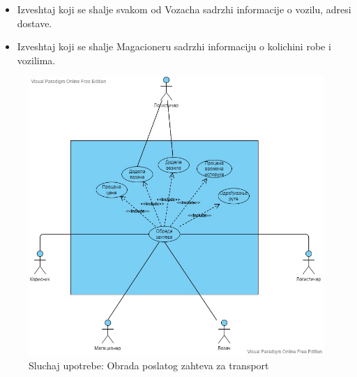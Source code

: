 \begin{enumerate}
\begin{itemize}
                \item Izveshtaj koji se shalje svakom od Vozacha sadrzhi informacije o vozilu, adresi dostave.
                
                \item Izveshtaj koji se shalje Magacioneru sadrzhi informaciju o kolichini robe i vozilima.
                
                
            \end{itemize}
\end{enumerate}

\newpage

\begin{figure}[h!]
    \includegraphics[scale=0.5]{Slike/SUobrada.jpg}
    \centering
    \caption{Sluchaj upotrebe: Obrada poslatog zahteva za transport}
    \label{dsuobradazahteva}
\end{figure}    


